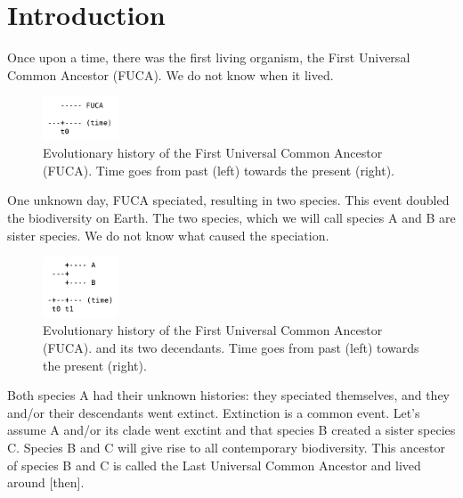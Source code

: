 \chapter{Introduction}
\label{chapter_introduction}
\newpage

\noindent

Once upon a time, there was the first living organism, the 
First Universal Common Ancestor (FUCA).
We do not know when it lived.

\begin{figure}[H]
  \includegraphics[width=0.2\textwidth]{t_0.png}
  \caption{
    Evolutionary history of the First Universal Common Ancestor (FUCA).
    Time goes from past (left) towards the present (right).
  }
  \label{fig:t_0}
\end{figure}

One unknown day, FUCA speciated, resulting in two species.
This event doubled the biodiversity on Earth.
The two species, which we will call species A and B
are sister species.
We do not know what caused the speciation.

\begin{figure}[H]
  \includegraphics[width=0.2\textwidth]{t_1.png}
  \caption{
    Evolutionary history of the First Universal Common Ancestor (FUCA).
    and its two decendants.
    Time goes from past (left) towards the present (right).
  }
  \label{fig:t_1}
\end{figure}

Both species A had their unknown histories: they speciated themselves,
and they and/or their descendants went extinct. 
Extinction is a common event. Let's assume A and/or its clade went
exctint and that species B created a sister species C. Species B
and C will give rise to all contemporary biodiversity. This ancestor of species B and C 
is called the Last Universal Common Ancestor and lived around [then].

